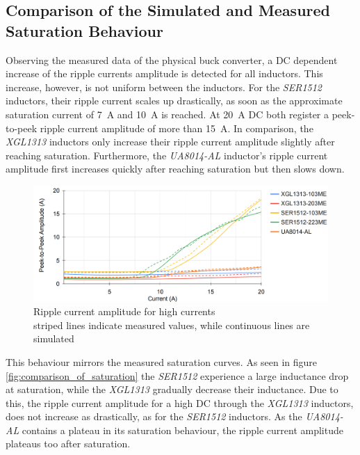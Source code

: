 \subsection{Comparison of the Simulated and Measured Saturation Behaviour}
Observing the measured data of the physical buck converter, a \ac{DC} dependent increase of the ripple currents amplitude is detected for all inductors. This increase, however, is not uniform between the inductors. For the \textit{SER1512} inductors, their ripple current scales up drastically, as soon as the approximate saturation current of \SI{7}{\A} and \SI{10}{\A} is reached. At \SI{20}{\A} \ac{DC} both register a peek-to-peek ripple current amplitude of more than \SI{15}{\A}. In comparison, the \textit{XGL1313} inductors only increase their ripple current amplitude slightly after reaching saturation. Furthermore, the \textit{UA8014-AL} inductor's ripple current amplitude first increases quickly after reaching saturation but then slows down.
\begin{figure}[H]
    \centering
    \includegraphics[width=1\linewidth]{Bilder//Kapitel4/High Current_2.png}
    \caption{Ripple current amplitude for high currents \\striped lines indicate measured values, while continuous lines are simulated}
    \label{fig:ripple_current_amplitude_for_high_currents}
\end{figure}
This behaviour mirrors the measured saturation curves. As seen in figure \ref{fig:comparison_of_saturation} the \textit{SER1512} experience a large inductance drop at saturation, while the \textit{XGL1313} gradually decrease their inductance. Due to this, the ripple current amplitude for a high \ac{DC} through the \textit{XGL1313} inductors, does not increase as drastically, as for the \textit{SER1512} inductors. As the \textit{UA8014-AL} contains a plateau in its saturation behaviour, the ripple current amplitude plateaus too after saturation.\\\\
